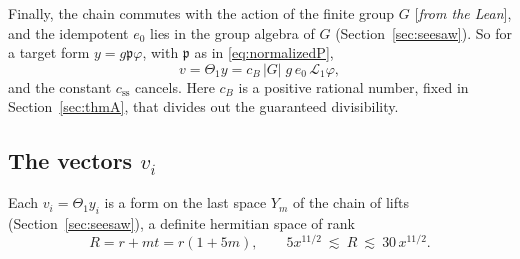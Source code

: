 \documentclass[11pt]{amsart}
\numberwithin{equation}{section}
\theoremstyle{definition}
\theoremstyle{remark}
\newcommand{\status}[1]{\textup{[\emph{#1}]}}
\begin{document}
Finally, the chain commutes with the action of the finite group $G$ \status{from the Lean}, and the idempotent $e_0$ lies in the group algebra of $G$ (Section~\ref{sec:seesaw}). So for a target form $y=g\mathfrak p\varphi$, with $\mathfrak p$ as in \eqref{eq:normalizedP},
\begin{equation}\label{eq:vcomposite}
 v=\Theta_1y=c_B\,|G|\;g\,e_0\,\mathcal L_1\varphi ,
\end{equation}
and the constant $c_{\mathrm{ss}}$ cancels. Here $c_B$ is a positive rational number, fixed in Section~\ref{sec:thmA}, that divides out the guaranteed divisibility.

\subsection*{The vectors $v_i$}
Each $v_i=\Theta_1y_i$ is a form on the last space $Y_m$ of the chain of lifts (Section~\ref{sec:seesaw}), a definite hermitian space of rank
\begin{equation}\label{eq:Rrank}
 R=r+mt=r(1+5m),\qquad 5x^{11/2}\ \lesssim\ R\ \lesssim\ 30\,x^{11/2}.
\end{equation}
\end{document}
